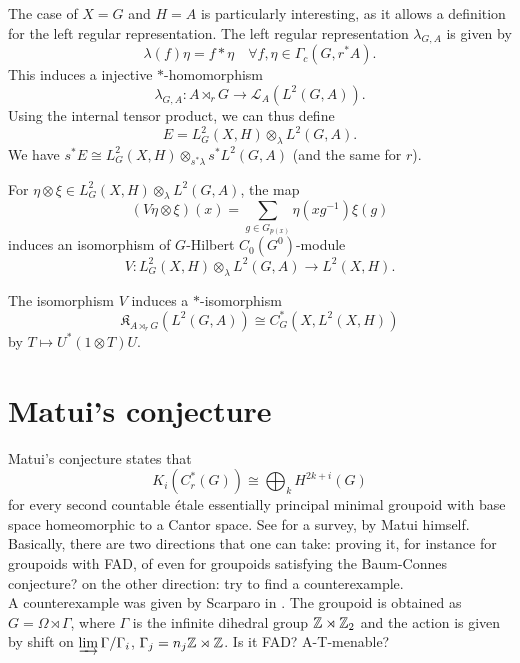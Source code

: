 The case of $X=G$ and $H=A$ is particularly interesting, as it allows a definition for the left regular representation. The left regular representation $\lambda_{G,A}$ is given by 
\[ \lambda(f )\eta  = f \ast \eta \quad\forall f,\eta \in \Gamma_c(G,r^*A).\] 
This induces a injective $*$-homomorphism 
\[\lambda_{G,A} : A\rtimes_r G \rightarrow \mathcal L_A( L^2(G,A)).\]
Using the internal tensor product, we can thus define 
\[E = L^2_G(X,H) \otimes_\lambda L^2(G,A).\]
We have $s^* E \cong L^2_G(X,H) \otimes_{s^* \lambda} s^* L^2(G,A)$ (and the same for $r$).

\begin{prop}
For $\eta \otimes \xi \in L^2_G(X,H) \otimes_\lambda L^2(G,A) $, the map 
\[(V\eta\otimes\xi)(x) =\sum_{g\in G_{p(x)}} \eta(xg^{-1})\xi (g)\]
induces an isomorphism of $G$-Hilbert $C_0(G^0)$-module
\[ V : L^2_G(X,H) \otimes_\lambda L^2(G,A) \rightarrow L^2(X,H).\]
\end{prop}

\begin{cor}
The isomorphism $V$ induces a $*$-isomorphism
\[\mathfrak K_{A\rtimes_r G} ( L^2(G,A) ) \cong C^*_G(X, L^2(X,H))\]
by $T\mapsto U^*(1\otimes T)U$.
\end{cor}
\newpage
\section{Matui's conjecture}

Matui's conjecture states that 
\[K_i (C_r^*(G)) \cong \bigoplus_k H^{2k+i}(G)\]
for every second countable \'etale essentially principal minimal groupoid with base space homeomorphic to a Cantor space. See \cite{MatuiSurvey} for a survey, by Matui himself.\\

Basically, there are two directions that one can take: proving it, for instance for groupoids with FAD, of even for groupoids satisfying the Baum-Connes conjecture? on the other direction: try to find a counterexample.\\

A counterexample was given by Scarparo in \cite{scarparo2018homology}. The groupoid is obtained as $G=\Omega \rtimes \Gamma$, where $\Gamma$ is the infinite dihedral group $\mathbb Z\rtimes \mathbb Z_2$ and the action is given by shift on $\varinjlim \Gamma/ \Gamma_i$, $\Gamma_j = n_j \mathbb Z \rtimes \mathbb Z$. Is it FAD? A-T-menable?\\

